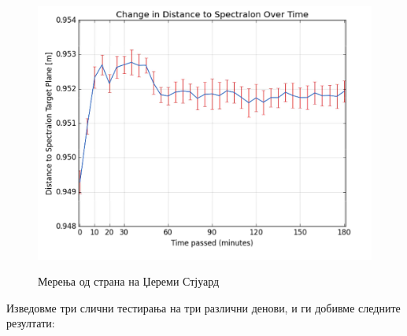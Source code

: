 \documentclass[12pt]{article}
\begin{document}
    \begin{figure}[H]
      \centering
      \includegraphics[width = 0.75\linewidth]{./images/heatup.png}
      \label{fig:heatup}
      \caption{Мерења од страна на Џереми Стјуард \cite{heatup}}
    \end{figure}

    Изведовме три слични тестирања на три различни денови, и ги добивме следните резултати:
\end{document}

